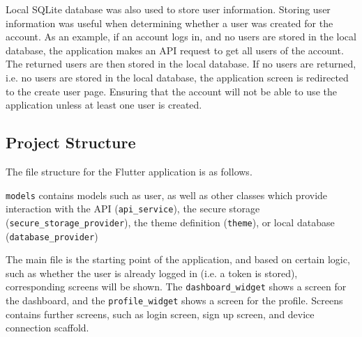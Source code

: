 \documentclass[12pt,openany,a4paper]{book}
\begin{document}
Local SQLite database was also used to store user information. Storing user
information was useful when determining whether a user was created for the account.
As an example, if an account logs in, and no users are stored in the local database,
the application makes an API request to get all users of the account. The returned users
are then stored in the local database. If no users are returned, i.e. no users are
stored in the local database, the application screen is redirected to the create user page.
Ensuring that the account will not be able to use the application unless at least one
user is created.

\subsection{Project Structure}

The file structure for the Flutter application is as follows.


\verb|models| contains models such as user, as well as other classes which provide
interaction with the API (\verb|api_service|), the secure storage
(\verb|secure_storage_provider|), the theme definition (\verb|theme|), or local database
(\verb|database_provider|)

The main file is the starting point of the application, and based on certain logic,
such as whether the user is already logged in (i.e. a token is stored), corresponding
screens will be shown. The \verb|dashboard_widget| shows a screen for the dashboard,
and the \verb|profile_widget| shows a screen for the profile. Screens contains further
screens, such as login screen, sign up screen, and device connection scaffold.
\end{document}

